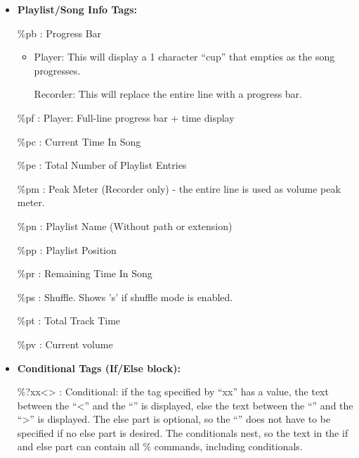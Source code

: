 \begin{itemize}
\item {\bfseries
Playlist/Song Info Tags:}

\%pb : Progress Bar 

\begin{itemize}
\item[] {
Player: This will display a 1 character
``cup'' that empties as the song progresses.}

Recorder: This will replace the entire line with a progress bar.
\end{itemize}
\%pf : Player: Full{}-line progress bar + time display

\%pc : Current Time In Song

\%pe : Total Number of Playlist Entries

\%pm : Peak Meter (Recorder only) {}- the entire line is used as volume
peak meter.

\%pn : Playlist Name (Without path or extension)

\%pp : Playlist Position

\%pr : Remaining Time In Song

\%ps : Shuffle. Shows 's' if shuffle
mode is enabled.

\%pt : Total Track Time

\%pv : Current volume
\item {\bfseries
Conditional Tags (If/Else block):}

 \%?xx{\textless}{\textbar}{\textgreater} : Conditional: if the tag
specified by ``xx'' has a value, the text
between the ``{\textless}'' and the ``{\textbar}'' is displayed, else the text
between the ``{\textbar}'' and the
``{\textgreater}'' is displayed. The else part is optional, so the ``{\textbar}'' does not have to be specified if no else part is desired. The conditionals
nest, so the text in the if and else part can contain all \% commands,
including conditionals.
\end{itemize}
